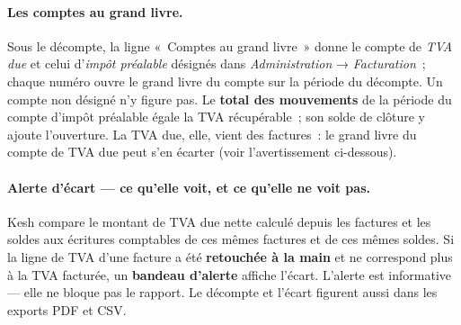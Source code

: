 \documentclass[a4paper,11pt,oneside]{article}
\begin{document}
\paragraph{Les comptes au grand livre.} Sous le décompte, la ligne «~Comptes au grand livre~» donne le compte
de \emph{TVA due} et celui d'\emph{impôt préalable} désignés dans \emph{Administration} → \emph{Facturation}~;
chaque numéro ouvre le grand livre du compte sur la période du décompte. Un compte non désigné n'y figure pas.
Le \textbf{total des mouvements} de la période du compte d'impôt préalable égale la TVA récupérable~; son solde
de clôture y ajoute l'ouverture. La TVA due, elle, vient des factures~: le grand livre du compte de TVA due peut
s'en écarter (voir l'avertissement ci-dessous).

\paragraph{Alerte d'écart --- ce qu'elle voit, et ce qu'elle ne voit pas.} Kesh compare le
montant de TVA due nette calculé depuis les factures et les soldes aux écritures comptables de ces mêmes factures et de ces mêmes soldes.
Si la ligne de TVA d'une facture a été \textbf{retouchée à la main} et ne correspond plus à la
TVA facturée, un \textbf{bandeau d'alerte} affiche l'écart. L'alerte est informative --- elle
ne bloque pas le rapport. Le décompte et l'écart figurent aussi dans les exports PDF et CSV.
\end{document}
